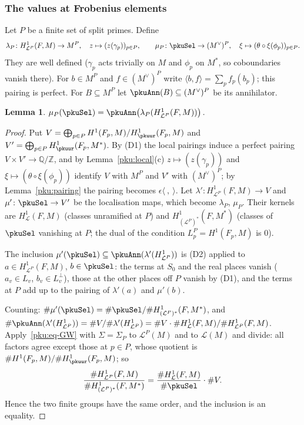 \documentclass[10pt]{amsart}
\newtheorem{lemma}[theorem]{Lemma}
\theoremstyle{definition}
\theoremstyle{remark}
\newcommand{\Z}{\mathbb Z}
\newcommand{\Q}{\mathbb Q}
\begin{document}
\subsubsection{The values at Frobenius elements}\label{pku:ss-image}

Let $P$ be a finite set of split primes. Define
\[
\lambda_P\colon H^1_{\mathcal L^P}(F,M)\to M^P,\quad z\mapsto(z(\gamma_p))_{p\in P},\qquad
\mu_P\colon\pkuSel\to(M^\vee)^P,\quad\xi\mapsto(\theta\circ\xi(\phi_p))_{p\in P}.
\]
They are well defined ($\gamma_p$ acts trivially on $M$ and $\phi_p$ on $M^*$, so coboundaries vanish
there). For $b\in M^P$ and $f\in(M^\vee)^P$ write $\langle b,f\rangle=\sum_pf_p(b_p)$; this pairing is
perfect. For $B\subseteq M^P$ let $\pkuAnn(B)\subseteq(M^\vee)^P$ be its annihilator.

\begin{lemma}\label{pku:image}
$\mu_P(\pkuSel)=\pkuAnn\bigl(\lambda_P(H^1_{\mathcal L^P}(F,M))\bigr)$.
\end{lemma}
\begin{proof}
Put $V=\bigoplus_{p\in P}H^1(F_p,M)/H^1_\pkuur(F_p,M)$ and $V'=\bigoplus_{p\in P}H^1_\pkuur(F_p,M^*)$. By
(D1) the local pairings induce a perfect pairing $V\times V'\to\Q/\Z$, and by
Lemma~\ref{pku:local}(c) $z\mapsto(z(\gamma_p))$ and $\xi\mapsto(\theta\circ\xi(\phi_p))$ identify $V$
with $M^P$ and $V'$ with $(M^\vee)^P$; by Lemma~\ref{pku:pairing} the pairing becomes $\epsilon
\langle\ ,\ \rangle$. Let $\lambda'\colon H^1_{\mathcal L^P}(F,M)\to V$ and $\mu'\colon\pkuSel\to V'$ be
the localisation maps, which become $\lambda_P$, $\mu_P$. Their kernels are $H^1_{\mathcal L}(F,M)$
(classes unramified at $P$) and $H^1_{(\mathcal L^P)^*}(F,M^*)$ (classes of $\pkuSel$ vanishing at
$P$; the dual of the condition $L^P_p=H^1(F_p,M)$ is $0$).

The inclusion $\mu'(\pkuSel)\subseteq\pkuAnn(\lambda'(H^1_{\mathcal L^P}))$ is (D2) applied to $a\in
H^1_{\mathcal L^P}(F,M)$, $b\in\pkuSel$: the terms at $S_0$ and the real places vanish ($a_v\in L_v$,
$b_v\in L_v^\perp$), those at the other places off $P$ vanish by (D1), and the terms at $P$ add up to
the pairing of $\lambda'(a)$ and $\mu'(b)$.

Counting: $\#\mu'(\pkuSel)=\#\pkuSel/\#H^1_{(\mathcal L^P)^*}(F,M^*)$, and
$\#\pkuAnn(\lambda'(H^1_{\mathcal L^P}))=\#V/\#\lambda'(H^1_{\mathcal L^P})=\#V\cdot\#H^1_{\mathcal L}(F,M)/
\#H^1_{\mathcal L^P}(F,M)$. Apply~\eqref{pku:eq-GW} with $\Sigma=\Sigma_P$ to $\mathcal L^P(M)$ and to
$\mathcal L(M)$ and divide: all factors agree except those at $p\in P$, whose quotient is
$\#H^1(F_p,M)/\#H^1_\pkuur(F_p,M)$; so
\[
\frac{\#H^1_{\mathcal L^P}(F,M)}{\#H^1_{(\mathcal L^P)^*}(F,M^*)}=\frac{\#H^1_{\mathcal L}(F,M)}
{\#\pkuSel}\cdot\#V .
\]
Hence the two finite groups have the same order, and the inclusion is an equality.
\end{proof}
\end{document}
